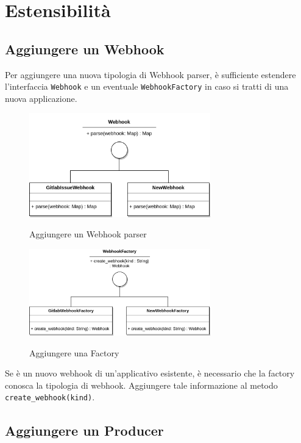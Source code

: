 \section{Estensibilità}\label{Estensibilita}

\subsection{Aggiungere un Webhook}

Per aggiungere una nuova tipologia di Webhook parser, è sufficiente estendere l'interfaccia \texttt{Webhook}
e un eventuale \texttt{WebhookFactory} in caso si tratti di una nuova applicazione.

\begin{figure}[H]
    \centering
    \includegraphics[width=0.7\textwidth]{img/EstensioneWebhook-Webhook.png}\\
    \caption{Aggiungere un Webhook parser}
\end{figure}


\begin{figure}[H]
    \centering
    \includegraphics[width=0.7\textwidth]{img/EstensioneWebhook-Factory.png}\\
    \caption{Aggiungere una Factory}
\end{figure}

Se è un nuovo webhook di un'applicativo esistente, è necessario che la factory conosca la tipologia di webhook.
Aggiungere tale informazione al metodo \texttt{create\_webhook(kind)}.


\subsection{Aggiungere un Producer}

